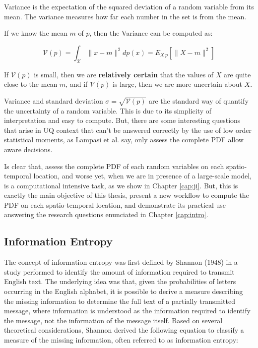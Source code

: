 \begin{defn}
Variance is the expectation of the squared deviation of a random variable from its mean. The variance measures how far each number in the set is from the mean.
\end{defn}

If we know the mean $m$ of $p$, then the Variance can be computed as:

\begin{equation}
\mathcal{V}(\textit{p}) = \int_{\mathcal{X}} \|x-m\|^2dp(x) = E_{X~p}[\|X-m\|^2]
\end{equation}

If $\mathcal{V}(\textit{p})$ is small, then we are \textbf{relatively certain} that the values of $X$ are quite close to the mean $m$, and if $\mathcal{V}(\textit{p})$ is large, then we are more uncertain about $X$.

Variance and standard deviation $\sigma = \sqrt{\mathcal{V}(\textit{p})}$ are the standard way of quantify the uncertainty of a random variable. This is due to its simplicity of interpretation and easy to compute. But, there are some interesting questions that arise in UQ context that can't be answered correctly by the use of low order statistical moments, as Lampasi et al. \cite{Lampasi2006} say, only assess the complete PDF allow aware decisions. 

Is clear that, assess the complete PDF of each random variables on each spatio-temporal location, and worse yet, when we are in presence of a large-scale model, is a computational intensive task, as we show in Chapter \ref{cap:ji}. But, this is exactly the main objective of this thesis, present a new workflow to compute the PDF on each spatio-temporal location, and demonstrate its practical use answering the research questions enunciated in Chapter \ref{cap:intro}.

\subsection{Information Entropy}
\label{InformationEntropy}
The concept of information entropy was first defined by Shannon (1948) in a study performed to identify the amount of information required to transmit English text. The underlying idea was that, given the probabilities of letters occurring in the English alphabet, it is possible to derive a measure describing the missing information to determine the full text of a partially transmitted message, where information is understood as the information required to identify the message, not the information of the message itself. Based on several theoretical considerations, Shannon derived the following equation to classify a measure of the missing information, often referred to as information entropy:

